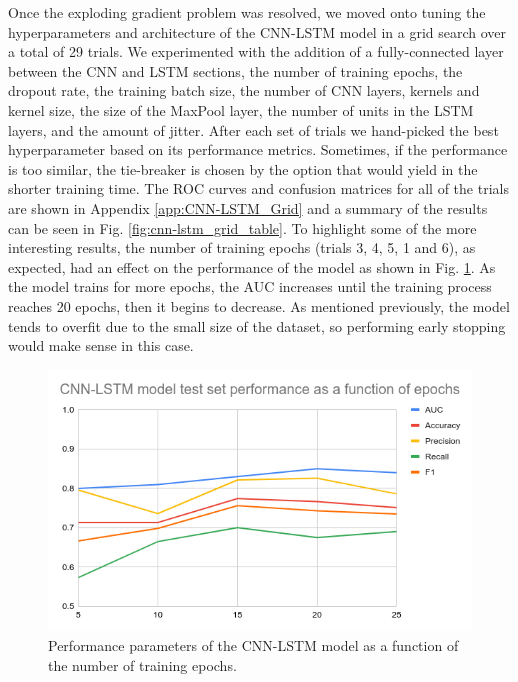 \documentclass[format=sigconf, nonacm=true, review=false, screen=true]{acmart}
\newcommand{\TODO}[1]{\textcolor{red}{TODO: #1}}
\begin{document}
Once the exploding gradient problem was resolved, we moved onto tuning the hyperparameters and architecture of the CNN-LSTM model in a grid search over a total of 29 trials. We experimented with the addition of a fully-connected layer between the CNN and LSTM sections, the number of training epochs, the dropout rate, the training batch size, the number of CNN layers, kernels and kernel size, the size of the MaxPool layer, the number of units in the LSTM layers, and the amount of jitter. After each set of trials we hand-picked the best hyperparameter based on its performance metrics. Sometimes, if the performance is too similar, the tie-breaker is chosen by the option that would yield in the shorter training time. The ROC curves and confusion matrices for all of the trials are shown in Appendix \ref{app:CNN-LSTM_Grid} and a summary of the results can be seen in Fig. \ref{fig:cnn-lstm_grid_table}.
To highlight some of the more interesting results, the number of training epochs (trials 3, 4, 5, 1 and 6), as expected, had an effect on the performance of the model as shown in Fig. \ref{fig:cnn-lstm_training_epochs}. As the model trains for more epochs, the AUC increases until the training process reaches 20 epochs, then it begins to decrease. As mentioned previously, the model tends to overfit due to the small size of the dataset, so performing early stopping would make sense in this case.

\begin{figure}
    \centering
    \includegraphics[width=\columnwidth]{figures/cnn-lstm_test_epochs.png}
    \caption{Performance parameters of the CNN-LSTM model as a function of the number of training epochs.}
    \label{fig:cnn-lstm_training_epochs}
\end{figure}
\end{document}
